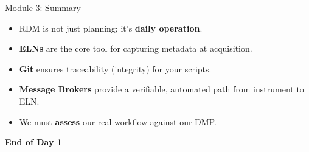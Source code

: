 \begin{frame}{Module 3: Summary}
    \begin{itemize}
        \item RDM is not just planning; it's \textbf{daily operation}.
        \item \textbf{ELNs} are the core tool for capturing metadata at acquisition.
        \item \textbf{Git} ensures traceability (integrity) for your scripts.
        \item \textbf{Message Brokers} provide a verifiable, automated path from instrument to ELN.
        \item We must \textbf{assess} our real workflow against our DMP.
    \end{itemize}
    \vfill
    \begin{center}
        \textbf{End of Day 1}
    \end{center}
\end{frame}